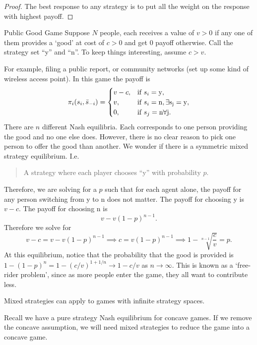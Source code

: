 \begin{proof}
    The best response to any strategy is to put all the weight on the response with highest payoff.
\end{proof}
 
\begin{aexample}{Public Good Game}{}
    Suppose $N$ people, each receives a value of $v>0$ if any one of them provides a `good' at cost of $c>0$ and get $0$ payoff otherwise. Call the strategy set ``y'' and ``n''. To keep things interesting, assume $c>v$.
\end{aexample}
For example, filing a public report, or community networks (set up some kind of wireless access point).
In this game the payoff is \[
\pi_i(s_i,\bar{s}_{-i})=\begin{cases}
    v-c,& \textrm{if }s_i=\rm{y},\\
    v,& \textrm{if }s_i=\rm{n},\exists s_j=\rm{y},\\
    0,& \textrm{if }s_j=\rm{n}\forall $j$.
\end{cases}
\]
There are $n$ different Nash equilibria. Each corresponds to one person providing the good and no one else does. However, there is no clear reason to pick one person to offer the good than another. We wonder if there is a symmetric mixed strategy equilibrium. I.e. \begin{quotation}
    A strategy where each player chooses ``y'' with probability $p$.
\end{quotation}
Therefore, we are solving for a $p$ such that for each agent alone, the payoff for any person switching from y to n does not matter.
The payoff for choosing y is $v-c$. The payoff for choosing n is \[
    v-v(1-p)^{n-1}.
\]
Therefore we solve for \[
    v-c=v-v(1-p)^{n-1}\implies c=v(1-p)^{n-1} \implies 1-\sqrt[n-1]{\frac{c}{v}}=p.
\]
At this equilibrium, notice that the probability that the good is provided is $1-(1-p)^n=1-(c/v)^{1+1/n}\to 1-c/v$ as $n\to\infty$. This is known as a `free-rider problem', since as more people enter the game, they all want to contribute less.

Mixed strategies can apply to games with infinite strategy spaces. 
\begin{remark}
    Recall we have a pure strategy Nash equilibrium for concave games. If we remove the concave assumption, we will need mixed strategies to reduce the game into a concave game.
\end{remark}

